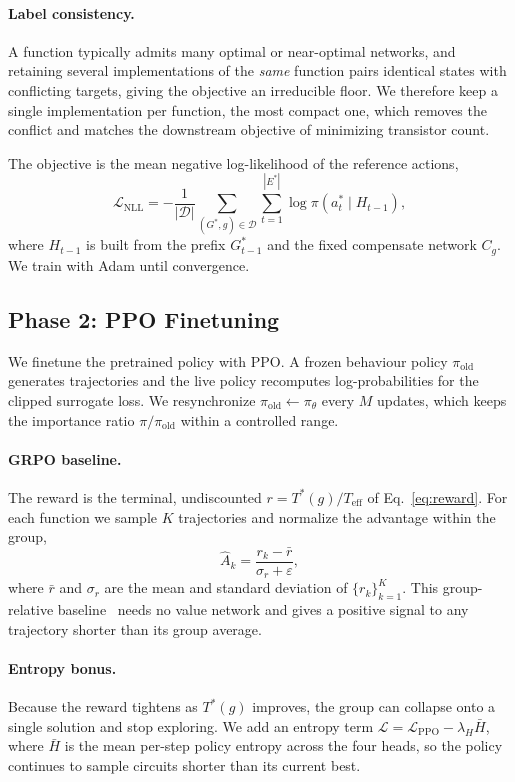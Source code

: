 \paragraph{Label consistency.}
A function typically admits many optimal or near-optimal networks, and
retaining several implementations of the \emph{same} function pairs identical
states with conflicting targets, giving the objective an irreducible floor.
We therefore keep a single implementation per function, the most compact one,
which removes the conflict and matches the downstream objective of minimizing
transistor count.

The objective is the mean negative log-likelihood of the reference actions,
\[
  \mathcal{L}_{\mathrm{NLL}}
  = -\frac{1}{|\mathcal{D}|} \sum_{(G^*, g) \in \mathcal{D}}
    \sum_{t=1}^{|E^*|} \log \pi(a_t^* \mid H_{t-1}),
\]
where $H_{t-1}$ is built from the prefix $G_{t-1}^*$ and the fixed
compensate network $C_g$.  We train with Adam until convergence.

\subsection{Phase 2: PPO Finetuning}
\label{sec:rl}

We finetune the pretrained policy with PPO.  A frozen behaviour policy
$\pi_{\mathrm{old}}$ generates trajectories and the live policy recomputes
log-probabilities for the clipped surrogate loss.  We resynchronize
$\pi_{\mathrm{old}} \leftarrow \pi_\theta$ every $M$ updates, which keeps the
importance ratio $\pi / \pi_{\mathrm{old}}$ within a controlled range.

\paragraph{GRPO baseline.}
The reward is the terminal, undiscounted $r = T^*(g)/T_{\mathrm{eff}}$ of
Eq.~\ref{eq:reward}.  For each function we sample $K$ trajectories and
normalize the advantage within the group,
\[
  \hat{A}_k = \frac{r_k - \bar{r}}{\sigma_r + \varepsilon},
\]
where $\bar{r}$ and $\sigma_r$ are the mean and standard deviation of
$\{r_k\}_{k=1}^K$.  This group-relative baseline~\cite{grpo} needs no value
network and gives a positive signal to any trajectory shorter than its group
average.

\paragraph{Entropy bonus.}
Because the reward tightens as $T^*(g)$ improves, the group can collapse onto
a single solution and stop exploring.  We add an entropy term
$\mathcal{L} = \mathcal{L}_{\mathrm{PPO}} - \lambda_H \bar{H}$, where
$\bar{H}$ is the mean per-step policy entropy across the four heads, so the
policy continues to sample circuits shorter than its current best.

